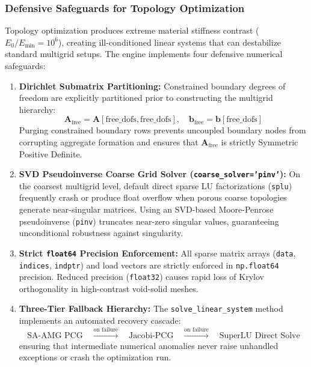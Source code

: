 \documentclass[11pt, a4paper]{article}
\begin{document}
\subsubsection{Defensive Safeguards for Topology Optimization}
Topology optimization produces extreme material stiffness contrast ($E_0 / E_{\min} = 10^6$), creating ill-conditioned linear systems that can destabilize standard multigrid setups. The engine implements four defensive numerical safeguards:
\begin{enumerate}
    \item \textbf{Dirichlet Submatrix Partitioning:} Constrained boundary degrees of freedom are explicitly partitioned prior to constructing the multigrid hierarchy:
    \begin{equation}
    \mathbf{A}_{\text{free}} = \mathbf{A}[\text{free\_dofs}, \text{free\_dofs}], \quad \mathbf{b}_{\text{free}} = \mathbf{b}[\text{free\_dofs}]
    \end{equation}
    Purging constrained boundary rows prevents uncoupled boundary nodes from corrupting aggregate formation and ensures that $\mathbf{A}_{\text{free}}$ is strictly Symmetric Positive Definite.
    \item \textbf{SVD Pseudoinverse Coarse Grid Solver (\texttt{coarse\_solver='pinv'}):} On the coarsest multigrid level, default direct sparse LU factorizations (\texttt{splu}) frequently crash or produce float overflow when porous coarse topologies generate near-singular matrices. Using an SVD-based Moore-Penrose pseudoinverse (\texttt{pinv}) truncates near-zero singular values, guaranteeing unconditional robustness against singularity.
    \item \textbf{Strict \texttt{float64} Precision Enforcement:} All sparse matrix arrays (\texttt{data}, \texttt{indices}, \texttt{indptr}) and load vectors are strictly enforced in \texttt{np.float64} precision. Reduced precision (\texttt{float32}) causes rapid loss of Krylov orthogonality in high-contrast void-solid meshes.
    \item \textbf{Three-Tier Fallback Hierarchy:} The \texttt{solve\_linear\_system} method implements an automated recovery cascade:
    \begin{equation}
    \text{SA-AMG PCG} \quad \xrightarrow{\text{on failure}} \quad \text{Jacobi-PCG} \quad \xrightarrow{\text{on failure}} \quad \text{SuperLU Direct Solve}
    \end{equation}
    ensuring that intermediate numerical anomalies never raise unhandled exceptions or crash the optimization run.
\end{enumerate}
\end{document}
